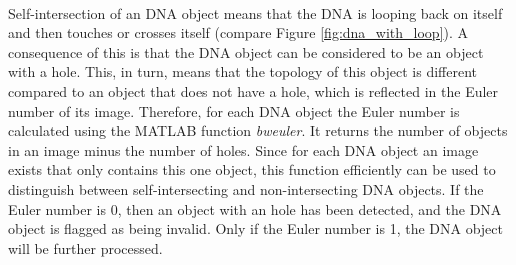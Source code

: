 \documentclass{article}
\begin{document}
\\Self-intersection of an DNA object means that the DNA is looping back on itself and then touches or crosses itself (compare Figure \ref{fig:dna_with_loop}). A consequence of this is that the DNA object can be considered to be an object with a hole. This, in turn, means that the topology of this object is different compared to an object that does not have a hole, which is reflected in the Euler number of its image. Therefore, for each DNA object the Euler number is calculated using the MATLAB function \textit{bweuler}. It returns the number of objects in an image minus the number of holes. Since for each DNA object an image exists that only contains this one object, this function efficiently can be used to distinguish between self-intersecting and non-intersecting DNA objects. If the Euler number is 0, then an object with an hole has been detected, and the DNA object is flagged as being invalid. Only if the Euler number is 1, the DNA object will be further processed.\\
\end{document}
